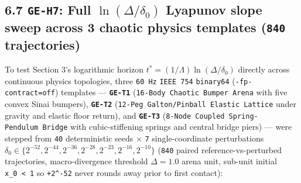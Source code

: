 \documentclass[10pt,letterpaper]{article}
\begin{document}
\subsection{\texorpdfstring{6.7 \texttt{GE-H7}: Full
\(\ln(\Delta / \delta_0)\) Lyapunov slope sweep across 3 chaotic physics
templates (\texttt{840}
trajectories)}{6.7 GE-H7: Full \textbackslash ln(\textbackslash Delta / \textbackslash delta\_0) Lyapunov slope sweep across 3 chaotic physics templates (840 trajectories)}}\label{ge-h7-full-lndelta-delta_0-lyapunov-slope-sweep-across-3-chaotic-physics-templates-840-trajectories}

To test Section 3's logarithmic horizon
\(t^* = (1/\Lambda)\ln(\Delta/\delta_0)\) directly across continuous
physics topologies, three \texttt{60\ Hz} \texttt{IEEE\ 754}
\texttt{binary64} (\texttt{-\allowbreak{}fp-\allowbreak{}contract=off}) templates ---
\textbf{\texttt{GE-T1}} (\texttt{16-\allowbreak{}Body\ Chaotic\ Bumper\ Arena} with
five convex Sinai bumpers), \textbf{\texttt{GE-T2}}
(\texttt{12-\allowbreak{}Peg\ Galton/\allowbreak{}Pinball\ Elastic\ Lattice} under gravity and
elastic floor return), and \textbf{\texttt{GE-T3}}
(\texttt{8-\allowbreak{}Node\ Coupled\ Spring-\allowbreak{}Pendulum\ Bridge} with cubic-stiffening
springs and central bridge piers) --- were stepped from \texttt{40}
deterministic seeds × \texttt{7} single-coordinate perturbations
\(\delta_0 \in \{2^{-52}, 2^{-44}, 2^{-36}, 2^{-28}, 2^{-23}, 2^{-16}, 2^{-10}\}\)
(\texttt{840} paired reference-vs-perturbed trajectories,
macro-divergence threshold \(\Delta = 1.0\) arena unit, sub-unit initial
\texttt{\textbar{}x\_0\textbar{}\ \textless{}\ 1} so \texttt{+2\^{}-52}
never rounds away prior to first contact):
\end{document}

